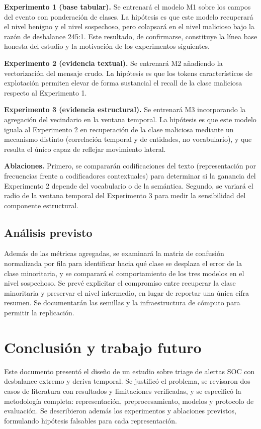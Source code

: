 \documentclass[conference]{IEEEtran}
\begin{document}
\textbf{Experimento 1 (base tabular).} Se entrenar\'a el modelo M1 sobre los campos del evento con ponderaci\'on de clases. La hip\'otesis es que este modelo recuperar\'a el nivel benigno y el nivel sospechoso, pero colapsar\'a en el nivel malicioso bajo la raz\'on de desbalance 245:1. Este resultado, de confirmarse, constituye la l\'inea base honesta del estudio y la motivaci\'on de los experimentos siguientes.

\textbf{Experimento 2 (evidencia textual).} Se entrenar\'a M2 a\~nadiendo la vectorizaci\'on del mensaje crudo. La hip\'otesis es que los tokens caracter\'isticos de explotaci\'on permiten elevar de forma sustancial el recall de la clase maliciosa respecto al Experimento 1.

\textbf{Experimento 3 (evidencia estructural).} Se entrenar\'a M3 incorporando la agregaci\'on del vecindario en la ventana temporal. La hip\'otesis es que este modelo iguala al Experimento 2 en recuperaci\'on de la clase maliciosa mediante un mecanismo distinto (correlaci\'on temporal y de entidades, no vocabulario), y que resulta el \'unico capaz de reflejar movimiento lateral.

\textbf{Ablaciones.} Primero, se comparar\'an codificaciones del texto (representaci\'on por frecuencias frente a codificadores contextuales) para determinar si la ganancia del Experimento 2 depende del vocabulario o de la sem\'antica. Segundo, se variar\'a el radio de la ventana temporal del Experimento 3 para medir la sensibilidad del componente estructural.

\subsection{An\'alisis previsto}
Adem\'as de las m\'etricas agregadas, se examinar\'a la matriz de confusi\'on normalizada por fila para identificar hacia qu\'e clase se desplaza el error de la clase minoritaria, y se comparar\'a el comportamiento de los tres modelos en el nivel sospechoso. Se prev\'e explicitar el compromiso entre recuperar la clase minoritaria y preservar el nivel intermedio, en lugar de reportar una \'unica cifra resumen. Se documentar\'an las semillas y la infraestructura de c\'omputo para permitir la replicaci\'on.

\section{Conclusi\'on y trabajo futuro}
Este documento present\'o el dise\~no de un estudio sobre triage de alertas SOC con desbalance extremo y deriva temporal. Se justific\'o el problema, se revisaron dos casos de literatura con resultados y limitaciones verificadas, y se especific\'o la metodolog\'ia completa: representaci\'on, preprocesamiento, modelos y protocolo de evaluaci\'on. Se describieron adem\'as los experimentos y ablaciones previstos, formulando hip\'otesis falsables para cada representaci\'on.
\end{document}
